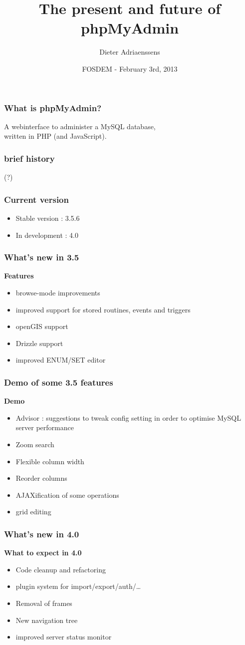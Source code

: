\documentclass[14pt]{beamer}
\title{The present and future of phpMyAdmin}
\author{Dieter Adriaenssens}
\institute[phpMyAdmin]{phpMyAdmin developer}
\date[FOSDEM - 3Feb2013]{FOSDEM - February 3rd, 2013}
\begin{document}
  \begin{frame}
  \titlepage
  \end{frame}
  \begin{frame}
    \frametitle{What is phpMyAdmin?}
      A webinterface to administer a MySQL database,\\
      written in PHP (and JavaScript).
  \end{frame}
  \begin{frame}
    \frametitle{brief history}
    (?)
  \end{frame}
  \begin{frame}
    \frametitle{Current version}
    \begin{itemize}[<+->]
      \item Stable version : 3.5.6
      \item In development : 4.0
    \end{itemize}
  \end{frame}
  \begin{frame}
    \frametitle{What's new in 3.5}
   \textbf{{\color{PmaOlive}Features}}
    \pause
    \begin{itemize}[<+->]
      \item browse-mode improvements
      \item improved support for stored routines, events and triggers
      \item openGIS support
      \item Drizzle support
      \item improved ENUM/SET editor
    \end{itemize}
  \end{frame}
  \begin{frame}
    \frametitle{Demo of some 3.5 features}
    \textbf{{\color{PmaOlive}Demo}}
    \begin{itemize}
      \item Advisor : suggestions to tweak config setting in order to optimise MySQL server performance
      \item Zoom search
      \item Flexible column width
      \item Reorder columns
      \item AJAXification of some operations
      \item grid editing
    \end{itemize}
  \end{frame}
  \begin{frame}
    \frametitle{What's new in 4.0}
    \textbf{{\color{PmaOlive}What to expect in 4.0}}
    \pause
    \begin{itemize}[<+->]
      \item Code cleanup and refactoring
      \item plugin system for import/export/auth/\ldots
      \item Removal of frames
      \item New navigation tree
      \item improved server status monitor
    \end{itemize}
  \end{frame}
\end{document}
